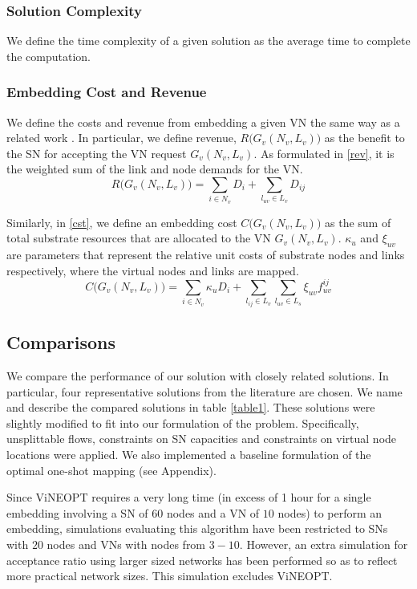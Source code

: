 \documentclass[journal]{IEEEtran}
\begin{document}
\subsubsection{Solution Complexity} We define the time complexity of a given solution as the average time to complete the computation.
\subsubsection{Embedding Cost and Revenue}
We define the costs and revenue from embedding a given \ac{VN} the same way as a related work \cite{Chowdhury12}. In particular, we define revenue, $R\bigg(G_v(N_v,L_v)\bigg)$ as the benefit to the \ac{SN} for accepting the VN request $G_v(N_v,L_v)$. As formulated in \eqref{rev}, it is the weighted sum of the link and node demands for the \ac{VN}.
 \begin{equation}
 R\bigg(G_v(N_v,L_v)\bigg) = \sum \limits_{i \in N_v} D_{i} + \sum \limits_{l_{uv} \in L_v} D_{ij}
 \label{rev}
 \end{equation}

Similarly, in \eqref{cst}, we define an embedding cost $C\bigg(G_v(N_v,L_v)\bigg)$ as the sum of total substrate resources that are allocated to the \ac{VN} $G_v(N_v,L_v)$. $\kappa_{u}$ and $\xi_{uv}$ are parameters that represent the relative unit costs of substrate nodes and links respectively, where the virtual nodes and links are mapped.
 \begin{equation}
 C\bigg(G_v(N_v,L_v)\bigg) = \sum \limits_{i \in N_v} \kappa_{u} D_{i} + \sum \limits_{l_{ij} \in L_v} \sum \limits_{l_{uv} \in L_s} \xi_{uv} f_{uv}^{ij}
 \label{cst}
 \end{equation}
 
\subsection{Comparisons}

We compare the performance of our solution with closely related solutions. In particular, four representative solutions from the literature are chosen. We name and describe the compared solutions in table \ref{table1}. These solutions were slightly modified to fit into our formulation of the problem. Specifically, unsplittable flows, constraints on \ac{SN} capacities and constraints on virtual node locations were applied. We also implemented a baseline formulation of the optimal one-shot mapping (see Appendix). 

Since ViNEOPT requires a very long time (in excess of 1 hour for a single embedding involving a \ac{SN} of $60$ nodes and a \ac{VN} of $10$ nodes) to perform an embedding, simulations evaluating this algorithm have been restricted to \ac{SN}s with $20$ nodes and \acp{VN} with nodes from $3-10$. However, an extra simulation for acceptance ratio using larger sized networks has been performed so as to reflect more practical network sizes. This simulation excludes ViNEOPT.
\end{document}
